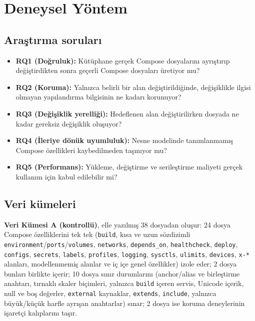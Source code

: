 \documentclass[conference]{IEEEtran}
\begin{document}
\section{Deneysel Yöntem}
\label{sec:yontem}

\subsection{Araştırma soruları}
\begin{itemize}
  \item \textbf{RQ1 (Doğruluk):} Kütüphane gerçek Compose dosyalarını ayrıştırıp değiştirdikten sonra geçerli Compose dosyaları üretiyor mu?
  \item \textbf{RQ2 (Koruma):} Yalnızca belirli bir alan değiştirildiğinde, değişiklikle ilgisi olmayan yapılandırma bilgisinin ne kadarı korunuyor?
  \item \textbf{RQ3 (Değişiklik yerelliği):} Hedeflenen alan değiştirilirken dosyada ne kadar gereksiz değişiklik oluşuyor?
  \item \textbf{RQ4 (İleriye dönük uyumluluk):} Nesne modelinde tanımlanmamış Compose özellikleri kaybedilmeden taşınıyor mu?
  \item \textbf{RQ5 (Performans):} Yükleme, değiştirme ve serileştirme maliyeti gerçek kullanım için kabul edilebilir mi?
\end{itemize}

\subsection{Veri kümeleri}
\textbf{Veri Kümesi A (kontrollü)}, elle yazılmış 38 dosyadan oluşur:
24 dosya Compose özelliklerini tek tek (\texttt{build}, kısa ve uzun
sözdizimli \texttt{environment}/\texttt{ports}/\texttt{volumes},
\texttt{networks}, \texttt{depends\_on}, \texttt{healthcheck},
\texttt{deploy}, \texttt{configs}, \texttt{secrets}, \texttt{labels},
\texttt{profiles}, \texttt{logging}, \texttt{sysctls}, \texttt{ulimits},
\texttt{devices}, \texttt{x-*} alanları, modellenmemiş alanlar ve iç içe
genel özellikler) izole eder; 2 dosya bunları birlikte içerir; 10 dosya
sınır durumlarını (anchor/alias ve birleştirme anahtarı, tırnaklı skaler
biçimleri, yalnızca \texttt{build} içeren servis, Unicode içerik, null ve
boş değerler, \texttt{external} kaynaklar, \texttt{extends},
\texttt{include}, yalnızca büyük/küçük harfle ayrışan anahtarlar) sınar;
2 dosya ise koruma deneylerinin işaretçi kalıplarını taşır.
\end{document}
